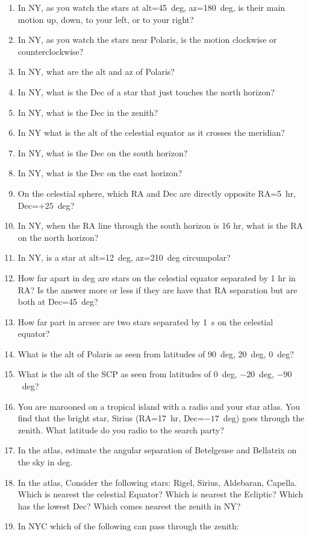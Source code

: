\documentclass{article}
\begin{document}
\begin{enumerate}
\item
In NY, as you watch the stars at alt=45~deg, az=180~deg, is their main
motion up, down, to your left, or to your right?
\item
In NY, as you watch the stars near Polaris, is the motion clockwise or
counterclockwise?
\item 
In NY, what are the alt and az of Polaris?
\item
In NY, what is the Dec of a star that just touches the north horizon?
\item
In NY, what is the Dec in the zenith?
\item
In NY what is the alt of the celestial equator as it crosses the
meridian?
\item
In NY, what is the Dec on the south horizon?
\item
In NY, what is the Dec on the east horizon?
\item
On the celestial sphere, which RA and Dec are directly opposite
RA=5~hr, Dec=$+25$~deg?
\item
In NY, when the RA line through the south horizon is 16 hr, what is the
RA on the north horizon?
\item
In NY, is a star at alt=12~deg, az=210~deg circumpolar?
\item
How far apart in deg are stars on the celestial equator separated by 1
hr in RA?  Is the answer more or less if they are have that RA
separation but are both at Dec=45~deg?
\item 
How far part in arcsec are two stars separated by 1~s on the celestial
equator?
\item
What is the alt of Polaris as seen from latitudes of 90~deg, 20~deg, 0~deg?
\item
What is the alt of the SCP as seen from latitudes of 0~deg, $-20$~deg,
$-90$~deg?
\item
You are marooned on a tropical island with a radio and your star
atlas. You find that the bright star, Sirius (RA=17~hr, Dec=$-17$~deg)
goes through the zenith. What latitude do you radio to the search
party?
\item
In the atlas, estimate the angular separation of Betelgeuse and
Bellatrix on the sky in deg.
\item
In the atlas, Consider the following stars: Rigel, Sirius, Aldebaran,
Capella. Which is nearest the celestial Equator? Which is nearest the
Ecliptic? Which has the lowest Dec? Which comes nearest the zenith in
NY?
\item 
In NYC which of the following can pass through the zenith:

\end{enumerate}
\end{document}
